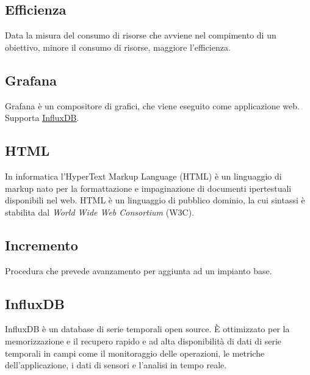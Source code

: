 	\subsection{Efficienza}
	\label{sec:efficienza}
	Data la misura del consumo di risorse che avviene nel compimento di un obiettivo, minore il consumo di risorse, maggiore l'efficienza.\newpage

	\subsection{Grafana}
	\label{sec:grafana}	
	Grafana è un compositore di grafici, che viene eseguito come applicazione web. Supporta \underline{\hyperref[sec:influxdb]{InfluxDB}}.
	
	
	\subsection{HTML}
	\label{sec:html}
	In informatica l'HyperText Markup Language (HTML) è un linguaggio di markup  nato per la formattazione e impaginazione di documenti ipertestuali disponibili nel web. HTML è un linguaggio di pubblico dominio, la cui sintassi è stabilita dal \emph{World Wide Web Consortium} (W3C).
	

	\subsection{Incremento}
	\label{sec:incremento}
	Procedura che prevede avanzamento per aggiunta ad un impianto base.

	\subsection{InfluxDB}
	\label{sec:influxdb}
	InfluxDB è un database di serie temporali open source. È ottimizzato per la memorizzazione e il recupero rapido e ad alta disponibilità di dati di serie temporali in campi come il monitoraggio delle operazioni, le metriche dell'applicazione, i dati di sensori e l'analisi in tempo reale.
	
